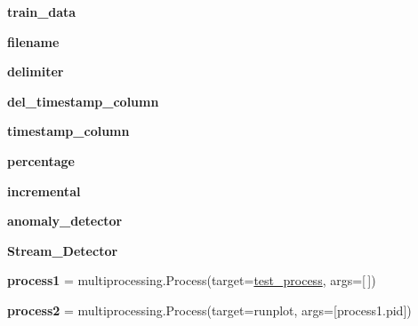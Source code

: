 \begin{DoxyCompactItemize}
\item 
{\bfseries train\+\_\+data}\hypertarget{namespaceSAD_1_1Main__Timestamp_a93b3cae7a7e75c4bc918789525528fa6}{}\label{namespaceSAD_1_1Main__Timestamp_a93b3cae7a7e75c4bc918789525528fa6}

\item 
{\bfseries filename}\hypertarget{namespaceSAD_1_1Main__Timestamp_aeab2940872abe7384f2ad3c5b10d4ad3}{}\label{namespaceSAD_1_1Main__Timestamp_aeab2940872abe7384f2ad3c5b10d4ad3}

\item 
{\bfseries delimiter}\hypertarget{namespaceSAD_1_1Main__Timestamp_a8adc97d3b73c2ff5f052d93f8fac3c94}{}\label{namespaceSAD_1_1Main__Timestamp_a8adc97d3b73c2ff5f052d93f8fac3c94}

\item 
{\bfseries del\+\_\+timestamp\+\_\+column}\hypertarget{namespaceSAD_1_1Main__Timestamp_a1fb08d1a77dbc5b6ae30e9119e754cba}{}\label{namespaceSAD_1_1Main__Timestamp_a1fb08d1a77dbc5b6ae30e9119e754cba}

\item 
{\bfseries timestamp\+\_\+column}\hypertarget{namespaceSAD_1_1Main__Timestamp_a67c5f08df7722fba790bca90a4e30b81}{}\label{namespaceSAD_1_1Main__Timestamp_a67c5f08df7722fba790bca90a4e30b81}

\item 
{\bfseries percentage}\hypertarget{namespaceSAD_1_1Main__Timestamp_a83c2dd92de32c79f02c8beb41c8a26f5}{}\label{namespaceSAD_1_1Main__Timestamp_a83c2dd92de32c79f02c8beb41c8a26f5}

\item 
{\bfseries incremental}\hypertarget{namespaceSAD_1_1Main__Timestamp_a7b85d8847f4314025a103bafd005c2ea}{}\label{namespaceSAD_1_1Main__Timestamp_a7b85d8847f4314025a103bafd005c2ea}

\item 
{\bfseries anomaly\+\_\+detector}
\item 
{\bfseries Stream\+\_\+\+Detector}
\item 
{\bfseries process1} = multiprocessing.\+Process(target=\hyperlink{namespaceSAD_1_1Main__Timestamp_a8238248c631be66c271ea6a591b587b4}{test\+\_\+process}, args=\mbox{[}$\,$\mbox{]})\hypertarget{namespaceSAD_1_1Main__Timestamp_a4cf9f3766f386686284f085ec3b1bec7}{}\label{namespaceSAD_1_1Main__Timestamp_a4cf9f3766f386686284f085ec3b1bec7}

\item 
{\bfseries process2} = multiprocessing.\+Process(target=runplot, args=\mbox{[}process1.\+pid\mbox{]})\hypertarget{namespaceSAD_1_1Main__Timestamp_a051640a544c35634b30f6f7c3d08a6bb}{}\label{namespaceSAD_1_1Main__Timestamp_a051640a544c35634b30f6f7c3d08a6bb}

\end{DoxyCompactItemize}


